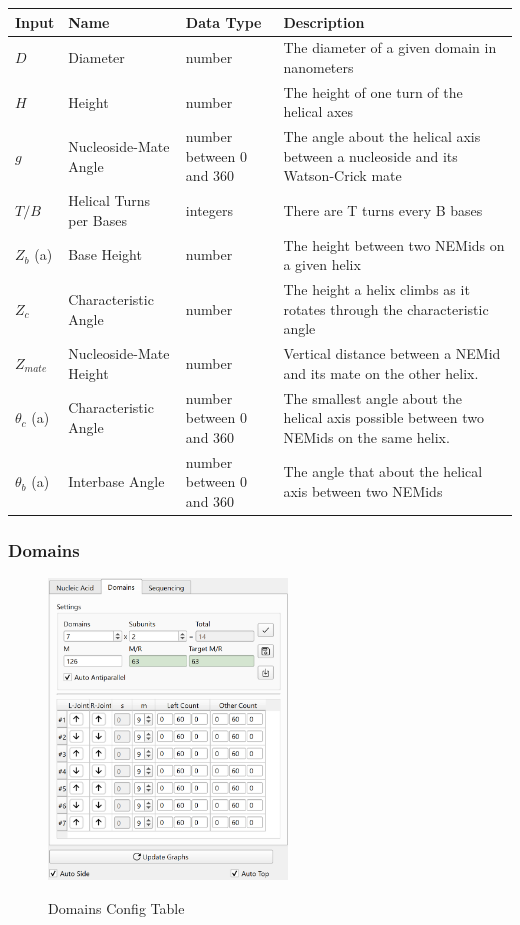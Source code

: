 \documentclass[titlepage]{article}
\begin{document}
	\begin{tabular}{|p{.5in}|p{1in}|p{.7in}|p{1.5in}|}
		\label{tab:setting-descriptions}
		\centering
		Input & Name & Data Type & Description \\
		\hline
		$D$ & Diameter & number & The diameter of a given domain in nanometers \\ \hline
		$H$ & Height & number & The height of one turn of the helical axes \\ \hline
		$g$ & Nucleoside-Mate Angle & number between 0 and 360 & The angle about the helical axis between a nucleoside and its Watson-Crick mate \\ \hline
		$T/B$ & Helical Turns per Bases & integers & There are T turns every B bases \\ \hline
		$Z_b$ (a) & Base Height & number & The height between two NEMids on a given helix \\ \hline
		$Z_c$ & Characteristic Angle & number & The height a helix climbs as it rotates through the characteristic angle \\ \hline
		$Z_{mate}$ & Nucleoside-Mate Height & number & Vertical distance between a NEMid and its mate on the other helix. \\ \hline
		$\theta_{c}$ (a) & Characteristic Angle & number between 0 and 360 & The smallest angle about the helical axis possible between two NEMids on the same helix. \\ \hline
		$\theta_{b}$ (a) & Interbase Angle & number between 0 and 360 & The angle that about the helical axis between two NEMids \\
	\end{tabular}
	
	\subsubsection{Domains}
	
	\begin{figure}
		\centering
		\caption{Domains Config Table}
		\includegraphics[width=2.5in]{domain-config-table.png}
		\label{fig:domain-config-table}
	\end{figure}
\end{document}
